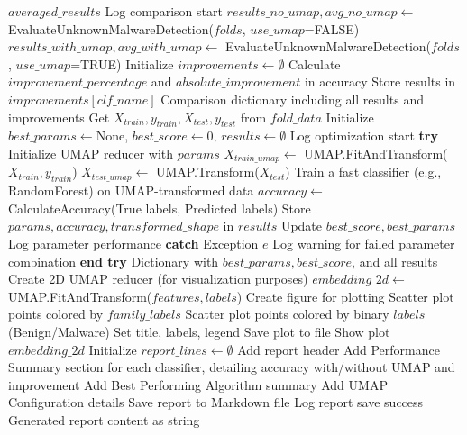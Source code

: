 \begin{algorithm}[!htbp]
\begin{algorithmic}[1]
    \EndFor
    \Return $averaged\_results$
\EndProcedure
\Statex
{}
    \State Log comparison start
    \State $results\_no\_umap, avg\_no\_umap \leftarrow$ EvaluateUnknownMalwareDetection($folds$, $use\_umap$=FALSE)
    \State $results\_with\_umap, avg\_with\_umap \leftarrow$ EvaluateUnknownMalwareDetection($folds$, $use\_umap$=TRUE)
    \State Initialize $improvements \leftarrow \emptyset$
            \State Calculate $improvement\_percentage$ and $absolute\_improvement$ in accuracy
            \State Store results in $improvements[clf\_name]$
        \EndIf
    \EndFor
    \Return Comparison dictionary including all results and improvements
\EndProcedure
\Statex
{}
    \State Get $X_{train}, y_{train}, X_{test}, y_{test}$ from $fold\_data$
    \State Initialize $best\_params \leftarrow \text{None}$, $best\_score \leftarrow 0$, $results \leftarrow \emptyset$
    \State Log optimization start
        \State \textbf{try}
            \State Initialize UMAP reducer with $params$
            \State $X_{train\_umap} \leftarrow$ UMAP.FitAndTransform($X_{train}, y_{train}$)
            \State $X_{test\_umap} \leftarrow$ UMAP.Transform($X_{test}$)
            \State Train a fast classifier (e.g., RandomForest) on UMAP-transformed data
            \State $accuracy \leftarrow$ CalculateAccuracy(True labels, Predicted labels)
            \State Store $params, accuracy, transformed\_shape$ in $results$
             Update $best\_score, best\_params$ \EndIf
            \State Log parameter performance
        \State \textbf{catch} {Exception $e$}
            \State Log warning for failed parameter combination
        \State \textbf{end try}
    \EndFor
    \Return Dictionary with $best\_params, best\_score$, and all results
\EndProcedure
\Statex
{}
    \State Create 2D UMAP reducer (for visualization purposes)
    \State $embedding\_2d \leftarrow$ UMAP.FitAndTransform($features, labels$)
    \State Create figure for plotting
        \State Scatter plot points colored by $family\_labels$
    \Else
        \State Scatter plot points colored by binary $labels$ (Benign/Malware)
    \EndIf
    \State Set title, labels, legend
    \State Save plot to file
    \State Show plot
    \Return $embedding\_2d$
\EndProcedure
\Statex
{}
    \State Initialize $report\_lines \leftarrow \emptyset$
    \State Add report header
    \State Add Performance Summary section for each classifier, detailing accuracy with/without UMAP and improvement
    \State Add Best Performing Algorithm summary
    \State Add UMAP Configuration details
    \State Save report to Markdown file
    \State Log report save success
    \Return Generated report content as string
\EndProcedure
\end{algorithmic}
\end{algorithm}

